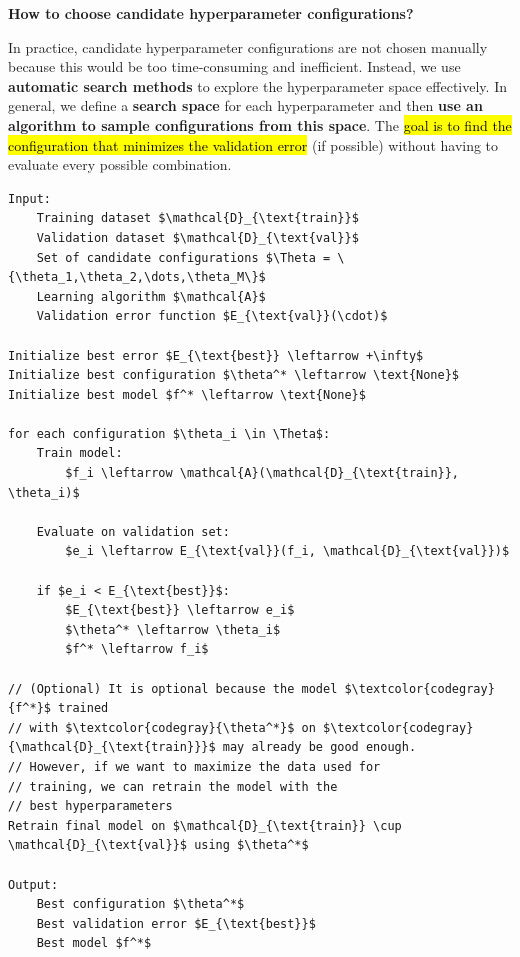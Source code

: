\highspace
\begin{flushleft}
    \textcolor{Green3}{ \textbf{How to choose candidate hyperparameter configurations?}}
\end{flushleft}
In practice, candidate hyperparameter configurations are not chosen manually because this would be too time-consuming and inefficient. Instead, we use \textbf{automatic search methods} to explore the hyperparameter space effectively. In general, we define a \textbf{search space} for each hyperparameter and then \textbf{use an algorithm to sample configurations from this space}. The \hl{goal is to find the configuration that minimizes the validation error} (if possible) without having to evaluate every possible combination.
\begin{lstlisting}[language=pseudo-code,mathescape=true,style={pseudocode-style},caption={Generic Hyperparameter Tuning Algorithm}]
Input:
    Training dataset $\mathcal{D}_{\text{train}}$
    Validation dataset $\mathcal{D}_{\text{val}}$
    Set of candidate configurations $\Theta = \{\theta_1,\theta_2,\dots,\theta_M\}$
    Learning algorithm $\mathcal{A}$
    Validation error function $E_{\text{val}}(\cdot)$

Initialize best error $E_{\text{best}} \leftarrow +\infty$
Initialize best configuration $\theta^* \leftarrow \text{None}$
Initialize best model $f^* \leftarrow \text{None}$

for each configuration $\theta_i \in \Theta$:
    Train model:
        $f_i \leftarrow \mathcal{A}(\mathcal{D}_{\text{train}}, \theta_i)$

    Evaluate on validation set:
        $e_i \leftarrow E_{\text{val}}(f_i, \mathcal{D}_{\text{val}})$

    if $e_i < E_{\text{best}}$:
        $E_{\text{best}} \leftarrow e_i$
        $\theta^* \leftarrow \theta_i$
        $f^* \leftarrow f_i$

// (Optional) It is optional because the model $\textcolor{codegray}{f^*}$ trained 
// with $\textcolor{codegray}{\theta^*}$ on $\textcolor{codegray}{\mathcal{D}_{\text{train}}}$ may already be good enough.
// However, if we want to maximize the data used for
// training, we can retrain the model with the
// best hyperparameters
Retrain final model on $\mathcal{D}_{\text{train}} \cup \mathcal{D}_{\text{val}}$ using $\theta^*$

Output:
    Best configuration $\theta^*$
    Best validation error $E_{\text{best}}$
    Best model $f^*$
\end{lstlisting}

